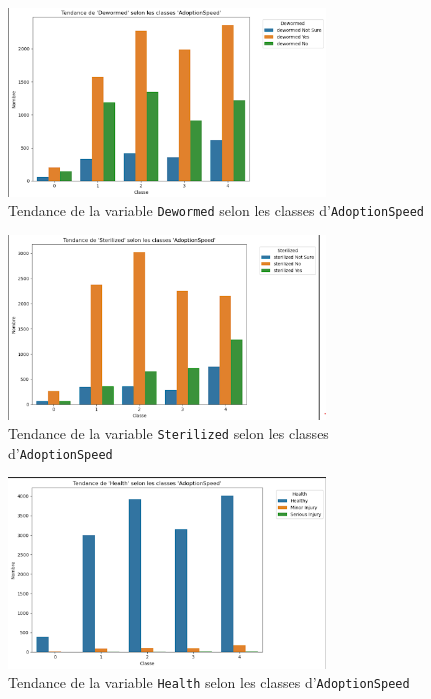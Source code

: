 \documentclass[a4paper,12pt]{article}
\begin{document}
\begin{figure}[H]
    \centering
    \includegraphics[width=0.75\textwidth]{dewormed_adoption_trend.png}
    \caption{Tendance de la variable \texttt{Dewormed} selon les classes d'\texttt{AdoptionSpeed}}
    \label{fig:dewormed_trend}
\end{figure}

\begin{figure}[H]
    \centering
    \includegraphics[width=0.75\textwidth]{sterilized_adoption_trend.png}
    \caption{Tendance de la variable \texttt{Sterilized} selon les classes d'\texttt{AdoptionSpeed}}
    \label{fig:sterilized_trend_1}
\end{figure}

\begin{figure}[H]
    \centering
    \includegraphics[width=0.75\textwidth]{health_adoption_trend.png}
    \caption{Tendance de la variable \texttt{Health} selon les classes d'\texttt{AdoptionSpeed}}
    \label{fig:health_trend}
\end{figure}
\end{document}
